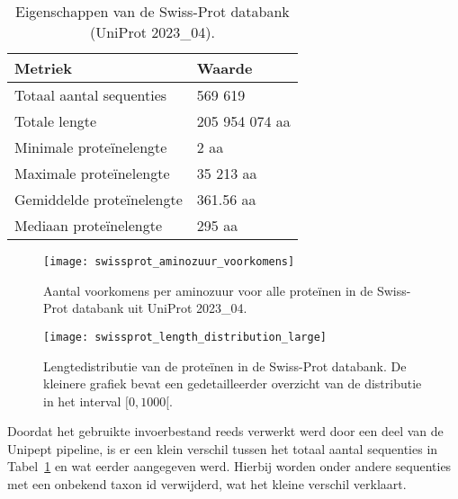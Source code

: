 \begin{table}[h]
    \centering
    \begin{tabular}{l l}
        Metriek                   & Waarde         \\
        \hline\hline
        Totaal aantal sequenties  & 569 619        \\
        Totale lengte             & 205 954 074 aa \\
        Minimale proteïnelengte   & 2 aa           \\
        Maximale proteïnelengte   & 35 213 aa      \\
        Gemiddelde proteïnelengte & 361.56 aa      \\
        Mediaan proteïnelengte    & 295 aa         \\
        \hline
    \end{tabular}
    \caption{Eigenschappen van de Swiss-Prot databank (UniProt 2023\_04).}
    \label{tab:swissprot_eigenschappen}
\end{table}


\begin{figure}[h]
    \centering
    \texttt{[image: swissprot\_aminozuur\_voorkomens]}
    \caption{Aantal voorkomens per aminozuur voor alle proteïnen in de Swiss-Prot databank uit UniProt 2023\_04.}
    \label{fig:swissprot_aminozuur}
\end{figure}

\begin{figure}[h]
    \centering
    \texttt{[image: swissprot\_length\_distribution\_large]}
    \caption{Lengtedistributie van de proteïnen in de Swiss-Prot databank. De kleinere grafiek bevat een gedetailleerder overzicht van de distributie in het interval $[0, 1000[$.}\label{fig:swissprot_length}
\end{figure}

Doordat het gebruikte invoerbestand reeds verwerkt werd door een deel van de Unipept pipeline, is er een klein verschil tussen het totaal aantal sequenties in Tabel~\ref{tab:swissprot_eigenschappen} en wat eerder aangegeven werd.
Hierbij worden onder andere sequenties met een onbekend taxon id verwijderd, wat het kleine verschil verklaart.


